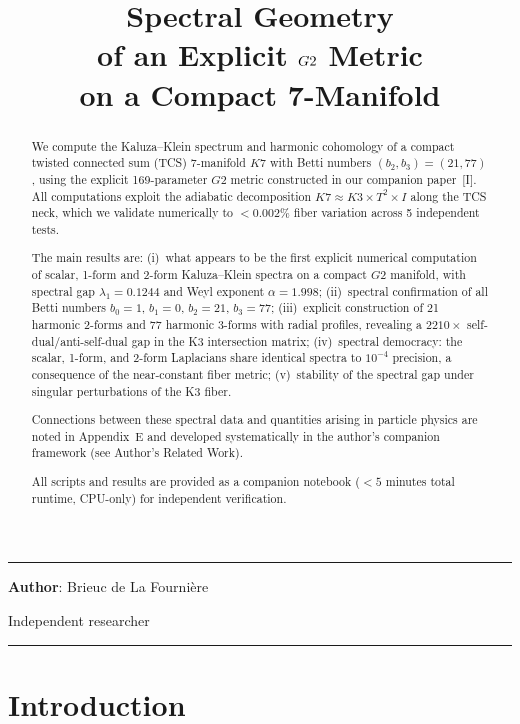 \documentclass[11pt,a4paper]{article}
\title{%
\LARGE\textbf{Spectral Geometry\\[0.2em]of an Explicit $\Gtwo$ Metric\\[0.2em]on a Compact 7-Manifold}
}
\author{}
\date{}
\newcommand{\Gtwo}{\mathrm{G}_2}
\newcommand{\Kseven}{K_7}
\theoremstyle{remark}
\def\Gtwo{G2}%
\def\Kseven{K7}%
\begin{document}
\maketitle
\noindent\rule{\textwidth}{0.2pt}

\noindent\textbf{Author}: Brieuc de La Fourni\`ere

\noindent Independent researcher

\vfill

\begin{abstract}
We compute the Kaluza--Klein spectrum and harmonic cohomology of a compact twisted
connected sum (TCS) 7-manifold $\Kseven$ with Betti numbers $(b_2, b_3) = (21, 77)$, using
the explicit 169-parameter $\Gtwo$ metric constructed in our companion paper~[I]. All
computations exploit the adiabatic decomposition $\Kseven \approx K3 \times T^2 \times I$ along the TCS
neck, which we validate numerically to $< 0.002\%$ fiber variation across 5
independent tests.

The main results are: (i)~what appears to be the first explicit numerical
computation of scalar, 1-form and 2-form Kaluza--Klein spectra on a compact $\Gtwo$
manifold, with spectral gap $\lambda_1 = 0.1244$ and Weyl exponent $\alpha = 1.998$; (ii)~spectral
confirmation of all Betti numbers $b_0 = 1$, $b_1 = 0$, $b_2 = 21$, $b_3 = 77$; (iii)~explicit
construction of 21 harmonic 2-forms and 77 harmonic 3-forms with radial profiles,
revealing a $2210\times$ self-dual/anti-self-dual gap in the K3 intersection matrix;
(iv)~spectral democracy: the scalar, 1-form, and 2-form Laplacians share identical
spectra to $10^{-4}$ precision, a consequence of the near-constant fiber metric;
(v)~stability of the spectral gap under singular perturbations of the K3 fiber.

Connections between these spectral data and quantities arising in particle physics
are noted in Appendix~E and developed systematically in the author's companion
framework (see Author's Related Work).

All scripts and results are provided as a companion notebook ($< 5$ minutes total
runtime, CPU-only) for independent verification.
\end{abstract}

\vfill
\noindent\rule{\textwidth}{0.2pt}

\newpage
\tableofcontents

\newpage

\section{Introduction}
\end{document}
